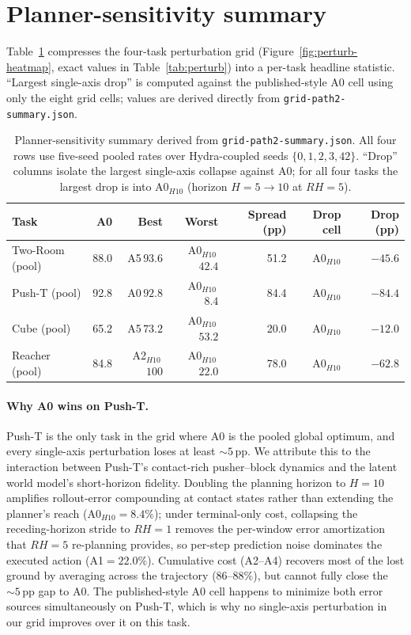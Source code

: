 \documentclass{article}
\begin{document}
\section{Planner-sensitivity summary}
\label{app:sensitivity-summary}

Table~\ref{tab:sensitivity-summary} compresses the four-task perturbation grid (Figure~\ref{fig:perturb-heatmap}, exact values in Table~\ref{tab:perturb}) into a per-task headline statistic. ``Largest single-axis drop'' is computed against the published-style A0 cell using only the eight grid cells; values are derived directly from \texttt{grid-path2-summary.json}.

\begin{table}[ht]
\centering\small
\caption{Planner-sensitivity summary derived from \texttt{grid-path2-summary.json}. All four rows use five-seed pooled rates over Hydra-coupled seeds $\{0,1,2,3,42\}$. ``Drop'' columns isolate the largest single-axis collapse against A0; for all four tasks the largest drop is into A0$_{H10}$ (horizon $H{=}5\to10$ at $RH{=}5$).}
\label{tab:sensitivity-summary}
\renewcommand{\arraystretch}{1.10}
\begin{tabular}{lrrrrrr}
\toprule
Task & A0 & Best & Worst & Spread (pp) & Drop cell & Drop (pp) \\
\midrule
Two-Room (pool)       & 88.0 & A5\,$93.6$        & A0$_{H10}$\,$42.4$  & 51.2 & A0$_{H10}$ & $-45.6$ \\
Push-T (pool)         & 92.8 & A0\,$92.8$        & A0$_{H10}$\,$8.4$   & 84.4 & A0$_{H10}$ & $-84.4$ \\
Cube (pool)           & 65.2 & A5\,$73.2$        & A0$_{H10}$\,$53.2$  & 20.0 & A0$_{H10}$ & $-12.0$ \\
Reacher (pool)        & 84.8 & A2$_{H10}$\,$100$ & A0$_{H10}$\,$22.0$  & 78.0 & A0$_{H10}$ & $-62.8$ \\
\bottomrule
\end{tabular}
\end{table}

\paragraph{Why A0 wins on Push-T.}
Push-T is the only task in the grid where A0 is the pooled global optimum, and every single-axis perturbation loses at least $\sim 5$\,pp. We attribute this to the interaction between Push-T's contact-rich pusher--block dynamics and the latent world model's short-horizon fidelity. Doubling the planning horizon to $H{=}10$ amplifies rollout-error compounding at contact states rather than extending the planner's reach (A0$_{H10}{=}8.4\%$); under terminal-only cost, collapsing the receding-horizon stride to $RH{=}1$ removes the per-window error amortization that $RH{=}5$ re-planning provides, so per-step prediction noise dominates the executed action (A1${=}22.0\%$). Cumulative cost (A2--A4) recovers most of the lost ground by averaging across the trajectory ($86$--$88\%$), but cannot fully close the $\sim 5$\,pp gap to A0. The published-style A0 cell happens to minimize both error sources simultaneously on Push-T, which is why no single-axis perturbation in our grid improves over it on this task.
\end{document}
